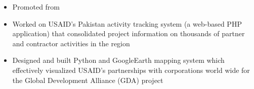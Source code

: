 \documentclass[letterpaper]{article}
\begin{document}
\vspace{-1mm}
\begin{itemize} \itemsep 0pt
    \item Promoted from

    \item Worked on USAID's Pakistan activity tracking system (a
    web-based PHP application) that consolidated project information on
    thousands of partner and contractor activities in the region

    \item Designed and built Python and GoogleEarth mapping system which
    effectively visualized USAID's partnerships with corporations world wide for
    the Global Development Alliance (GDA) project


\end{itemize}
\vspace{1mm}
\end{document}
